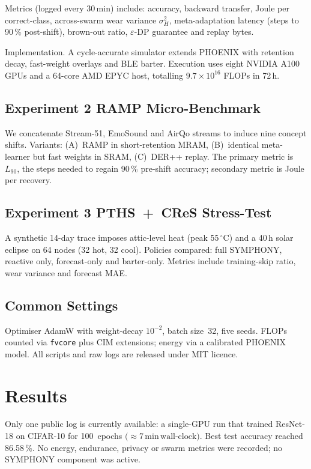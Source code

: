 \documentclass{article}
\begin{document}
Metrics (logged every 30\,min) include: accuracy, backward transfer, Joule per correct-class, across-swarm wear variance $\sigma_{H}^{2}$, meta-adaptation latency (steps to 90\,\% post-shift), brown-out ratio, $\varepsilon$-DP guarantee and replay bytes.

Implementation. A cycle-accurate simulator extends PHOENIX with retention decay, fast-weight overlays and BLE barter. Execution uses eight NVIDIA A100 GPUs and a 64-core AMD EPYC host, totalling $9.7\times10^{16}$ FLOPs in 72\,h.

\subsection{Experiment 2 \textendash{} RAMP Micro-Benchmark}
We concatenate Stream-51, EmoSound and AirQo streams to induce nine concept shifts. Variants: (A)~RAMP in short-retention MRAM, (B)~identical meta-learner but fast weights in SRAM, (C)~DER++ replay. The primary metric is $L_{90}$, the steps needed to regain 90\,\% pre-shift accuracy; secondary metric is Joule per recovery.

\subsection{Experiment 3 \textendash{} PTHS~+~CReS Stress-Test}
A synthetic 14-day trace imposes attic-level heat (peak 55\,$^{\circ}$C) and a 40\,h solar eclipse on 64 nodes (32 hot, 32 cool). Policies compared: full SYMPHONY, reactive only, forecast-only and barter-only. Metrics include training-skip ratio, wear variance and forecast MAE.

\subsection{Common Settings}
Optimiser AdamW with weight-decay $10^{-2}$, batch size~32, five seeds. FLOPs counted via \texttt{fvcore} plus CIM extensions; energy via a calibrated PHOENIX model. All scripts and raw logs are released under MIT licence.

\section{Results}\label{sec:results}
Only one public log is currently available: a single-GPU run that trained ResNet-18 on CIFAR-10 for 100~epochs $\bigl(\approx 7\,\mathrm{min}\,\text{wall-clock}\bigr)$. Best test accuracy reached 86.58\,\%. No energy, endurance, privacy or swarm metrics were recorded; no SYMPHONY component was active.
\end{document}
